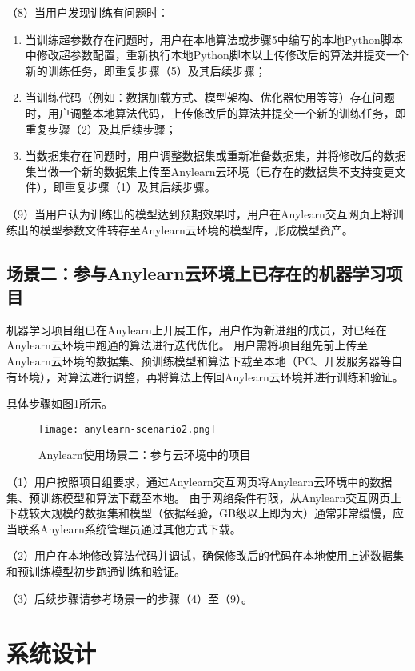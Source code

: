 （8）当用户发现训练有问题时：
\begin{enumerate}
  \item 当训练超参数存在问题时，用户在本地算法或步骤5中编写的本地Python脚本中修改超参数配置，重新执行本地Python脚本以上传修改后的算法并提交一个新的训练任务，即重复步骤（5）及其后续步骤；
  \item 当训练代码（例如：数据加载方式、模型架构、优化器使用等等）存在问题时，用户调整本地算法代码，上传修改后的算法并提交一个新的训练任务，即重复步骤（2）及其后续步骤；
  \item 当数据集存在问题时，用户调整数据集或重新准备数据集，并将修改后的数据集当做一个新的数据集上传至Anylearn云环境（已存在的数据集不支持变更文件），即重复步骤（1）及其后续步骤。
\end{enumerate}

（9）当用户认为训练出的模型达到预期效果时，用户在Anylearn交互网页上将训练出的模型参数文件转存至Anylearn云环境的模型库，形成模型资产。

\subsection{场景二：参与Anylearn云环境上已存在的机器学习项目}

机器学习项目组已在Anylearn上开展工作，用户作为新进组的成员，对已经在Anylearn云环境中跑通的算法进行迭代优化。
用户需将项目组先前上传至Anylearn云环境的数据集、预训练模型和算法下载至本地（PC、开发服务器等自有环境），对算法进行调整，再将算法上传回Anylearn云环境并进行训练和验证。

具体步骤如图\ref{fig:scenario2}所示。

\begin{figure}
  \centering
  \texttt{[image: anylearn-scenario2.png]}
  \caption{Anylearn使用场景二：参与云环境中的项目}
  \label{fig:scenario2}
\end{figure}

（1）用户按照项目组要求，通过Anylearn交互网页将Anylearn云环境中的数据集、预训练模型和算法下载至本地。
由于网络条件有限，从Anylearn交互网页上下载较大规模的数据集和模型（依据经验，GB级以上即为大）通常非常缓慢，应当联系Anylearn系统管理员通过其他方式下载。

（2）用户在本地修改算法代码并调试，确保修改后的代码在本地使用上述数据集和预训练模型初步跑通训练和验证。

（3）后续步骤请参考场景一的步骤（4）至（9）。


\section{系统设计}

